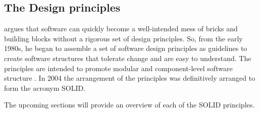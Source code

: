 \subsection{The Design principles} \label{subsec_design_principles}

\textcite[78]{robert_c_martin_clean_2018} argues that software can quickly become a
well-intended mess of bricks and building blocks without a rigorous set of design
principles. So, from the early 1980s, he began to assemble a set of software design
principles as guidelines to create software structures that tolerate change and are easy
to understand. The principles are intended to promote modular and component-level software
structure \parencite[79]{robert_c_martin_clean_2018}. In 2004 the arrangement of the
principles was definitively arranged to form the acronym SOLID. 

The upcoming sections will provide an overview of each of the SOLID principles.





